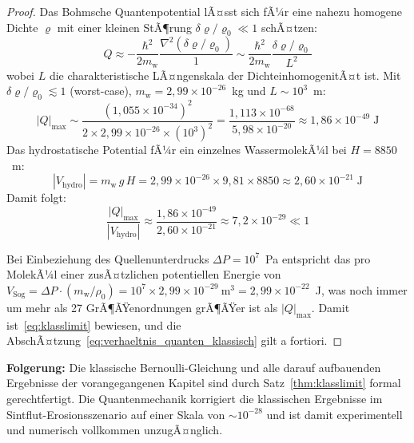 ﻿\documentclass[12pt,a4paper]{report}
\begin{document}
\begin{proof}
	Das Bohmsche Quantenpotential lÃ¤sst sich fÃ¼r eine nahezu homogene Dichte $\varrho$ mit einer kleinen StÃ¶rung $\delta\varrho/\varrho_0 \ll 1$ schÃ¤tzen:
	\begin{equation}
		Q \approx -\frac{\hbar^2}{2m_\mathrm{w}}\frac{\nabla^2(\delta\varrho/\varrho_0)}{1} \sim \frac{\hbar^2}{2m_\mathrm{w}}\frac{\delta\varrho/\varrho_0}{L^2}
		\label{eq:Q_abschaetzung}
	\end{equation}
	wobei $L$ die charakteristische LÃ¤ngenskala der DichteinhomogenitÃ¤t ist. Mit $\delta\varrho/\varrho_0 \lesssim 1$ (worst-case), $m_\mathrm{w} = 2{,}99\times10^{-26}$~kg und $L \sim 10^3$~m:
	\begin{equation}
		|Q|_\mathrm{max} \sim \frac{(1{,}055\times10^{-34})^2}{2\times2{,}99\times10^{-26}\times(10^3)^2} = \frac{1{,}113\times10^{-68}}{5{,}98\times10^{-20}} \approx 1{,}86\times10^{-49}\;\text{J}
		\label{eq:Q_numerisch}
	\end{equation}
	Das hydrostatische Potential fÃ¼r ein einzelnes WassermolekÃ¼l bei $H = 8850$~m:
	\begin{equation}
		|V_\mathrm{hydro}| = m_\mathrm{w}\,g\,H = 2{,}99\times10^{-26}\times9{,}81\times8850 \approx 2{,}60\times10^{-21}\;\text{J}
		\label{eq:V_hydro_numerisch}
	\end{equation}
	Damit folgt:
	\begin{equation}
		\frac{|Q|_\mathrm{max}}{|V_\mathrm{hydro}|} \approx \frac{1{,}86\times10^{-49}}{2{,}60\times10^{-21}} \approx 7{,}2\times10^{-29} \ll 1
		\label{eq:verhaeltnis_explizit}
	\end{equation}
	
	Bei Einbeziehung des Quellenunterdrucks $\Delta P = 10^7$~Pa entspricht das pro MolekÃ¼l einer zusÃ¤tzlichen potentiellen Energie von $V_\mathrm{Sog} = \Delta P \cdot (m_\mathrm{w}/\rho_0) = 10^7 \times 2{,}99\times10^{-29}~\text{m}^3 = 2{,}99\times10^{-22}$~J, was noch immer um mehr als 27 GrÃ¶ÃŸenordnungen grÃ¶ÃŸer ist als $|Q|_\mathrm{max}$. Damit ist~\eqref{eq:klasslimit} bewiesen, und die AbschÃ¤tzung~\eqref{eq:verhaeltnis_quanten_klassisch} gilt a fortiori.
\end{proof}

\textbf{Folgerung:} Die klassische Bernoulli-Gleichung und alle darauf aufbauenden Ergebnisse der vorangegangenen Kapitel sind durch Satz~\ref{thm:klasslimit} formal gerechtfertigt. Die Quantenmechanik korrigiert die klassischen Ergebnisse im Sintflut-Erosionsszenario auf einer Skala von $\sim 10^{-28}$ und ist damit experimentell und numerisch vollkommen unzugÃ¤nglich.
\end{document}

